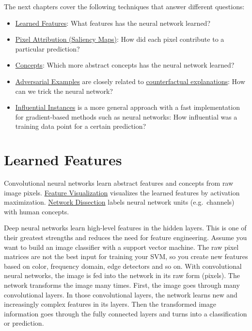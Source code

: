 \documentclass[
  11pt,
]{scrbook}
\providecommand{\tightlist}{%
  \setlength{\itemsep}{0pt}\setlength{\parskip}{0pt}}
\begin{document}
The next chapters cover the following techniques that answer different questions:

\begin{itemize}
\tightlist
\item
  \protect\hyperlink{feature-visualization}{Learned Features}: What features has the neural network learned?
\item
  \protect\hyperlink{pixel-attribution}{Pixel Attribution (Saliency Maps)}: How did each pixel contribute to a particular prediction?
\item
  \protect\hyperlink{neural-concepts}{Concepts}: Which more abstract concepts has the neural network learned?
\item
  \protect\hyperlink{adversarial}{Adversarial Examples} are closely related to \protect\hyperlink{counterfactual}{counterfactual explanations}: How can we trick the neural network?
\item
  \protect\hyperlink{influential}{Influential Instances} is a more general approach with a fast implementation for gradient-based methods such as neural networks: How influential was a training data point for a certain prediction?
\end{itemize}

\newpage

\hypertarget{cnn-features}{%
\section{Learned Features}\label{cnn-features}}

Convolutional neural networks learn abstract features and concepts from raw image pixels.
\protect\hyperlink{feature-visualization}{Feature Visualization} visualizes the learned features by activation maximization.
\protect\hyperlink{network-dissection}{Network Dissection} labels neural network units (e.g.~channels) with human concepts.

Deep neural networks learn high-level features in the hidden layers.
This is one of their greatest strengths and reduces the need for feature engineering.
Assume you want to build an image classifier with a support vector machine.
The raw pixel matrices are not the best input for training your SVM, so you create new features based on color, frequency domain, edge detectors and so on.
With convolutional neural networks, the image is fed into the network in its raw form (pixels).
The network transforms the image many times.
First, the image goes through many convolutional layers.
In those convolutional layers, the network learns new and increasingly complex features in its layers.
Then the transformed image information goes through the fully connected layers and turns into a classification or prediction.
\end{document}
